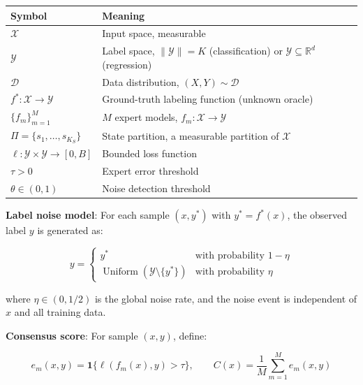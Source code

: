 \documentclass[
  12pt,
]{ctexart}
\begin{document}
\begin{longtable}[]{@{}
  >{\raggedright\arraybackslash}p{}
  >{\raggedright\arraybackslash}p{}@{}}
\toprule\noalign{}
\begin{minipage}[b]{\linewidth}\raggedright
Symbol
\end{minipage} & \begin{minipage}[b]{\linewidth}\raggedright
Meaning
\end{minipage} \\
\midrule\noalign{}
\endhead
\bottomrule\noalign{}
\endlastfoot
\(\mathcal{X}\) & Input space, measurable \\
\(\mathcal{Y}\) & Label space, \(\|\mathcal{Y}\| = K\) (classification)
or \(\mathcal{Y} \subseteq \mathbb{R}^d\) (regression) \\
\(\mathcal{D}\) & Data distribution, \((X, Y) \sim \mathcal{D}\) \\
\(f^* : \mathcal{X} \to \mathcal{Y}\) & Ground-truth labeling function
(unknown oracle) \\
\(\{f_m\}_{m=1}^M\) & \(M\) expert models,
\(f_m : \mathcal{X} \to \mathcal{Y}\) \\
\(\Pi = \{s_1, \dots, s_{K_S}\}\) & State partition, a measurable
partition of \(\mathcal{X}\) \\
\(\ell : \mathcal{Y} \times \mathcal{Y} \to [0, B]\) & Bounded loss
function \\
\(\tau > 0\) & Expert error threshold \\
\(\theta \in (0, 1)\) & Noise detection threshold \\
\end{longtable}

\textbf{Label noise model}: For each sample \((x, y^*)\) with
\(y^* = f^*(x)\), the observed label \(y\) is generated as:

\[y = \begin{cases}
y^* & \text{with probability } 1 - \eta \\
\operatorname{Uniform}(\mathcal{Y} \setminus \{y^*\}) & \text{with probability } \eta
\end{cases}\]

where \(\eta \in (0, 1/2)\) is the global noise rate, and the noise
event is independent of \(x\) and all training data.

\textbf{Consensus score}: For sample \((x, y)\), define:

\[e_m(x, y) = \mathbf{1}\{\ell(f_m(x), y) > \tau\}, \qquad
C(x) = \frac{1}{M} \sum_{m=1}^M e_m(x, y)\]
\end{document}
